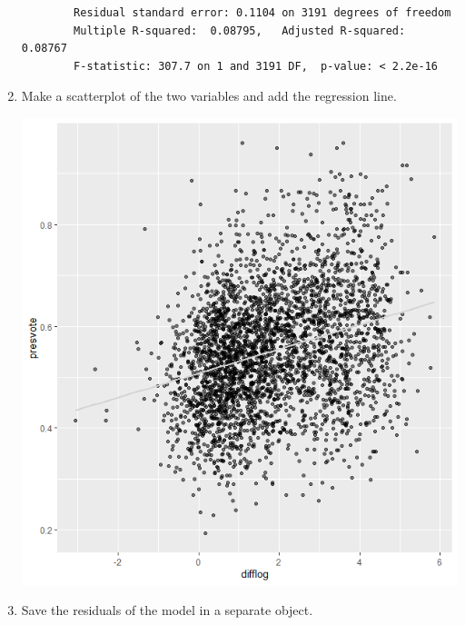 \documentclass[12pt,letterpaper]{article}
\begin{document}
\begin{enumerate}
\begin{verbatim}
		Residual standard error: 0.1104 on 3191 degrees of freedom
		Multiple R-squared:  0.08795,	Adjusted R-squared:  0.08767 
		F-statistic: 307.7 on 1 and 3191 DF,  p-value: < 2.2e-16
			\end{verbatim}
		\vspace{1cm}
		\item Make a scatterplot of the two variables and add the regression line. 
		
		\includegraphics{Q2P1.png}
			\vspace{2cm}
		\item Save the residuals of the model in a separate object.
			

\end{enumerate}
\end{document}
